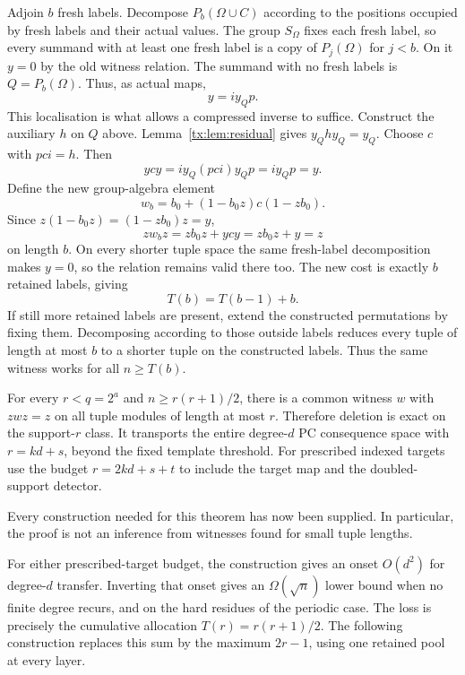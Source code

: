 Adjoin $b$ fresh labels. Decompose $P_b(\Omega\cup C)$ according to the positions occupied by fresh labels and their actual values. The group $S_\Omega$ fixes each fresh label, so every summand with at least one fresh label is a copy of $P_j(\Omega)$ for $j<b$. On it $y=0$ by the old witness relation. The summand with no fresh labels is $Q=P_b(\Omega)$. Thus, as actual maps,
\[y=i y_Q p.\]
This localisation is what allows a compressed inverse to suffice. Construct the auxiliary $h$ on $Q$ above. Lemma~\ref{tx:lem:residual} gives $y_Qhy_Q=y_Q$. Choose $c$ with $pci=h$. Then
\[ycy=i y_Q(pci)y_Qp=i y_Qp=y.\]
Define the new group-algebra element
\[w_b=b_0+(1-b_0z)c(1-zb_0).\]
Since $z(1-b_0z)=(1-zb_0)z=y$,
\[zw_bz=zb_0z+ycy=zb_0z+y=z\]
on length $b$. On every shorter tuple space the same fresh-label decomposition makes $y=0$, so the relation remains valid there too. The new cost is exactly $b$ retained labels, giving
\[T(b)=T(b-1)+b.\]
If still more retained labels are present, extend the constructed permutations by fixing them. Decomposing according to those outside labels reduces every tuple of length at most $b$ to a shorter tuple on the constructed labels. Thus the same witness works for all $n\ge T(b)$.

\begin{theorem}
For every $r<q=2^a$ and $n\ge r(r+1)/2$, there is a common witness $w$ with $zwz=z$ on all tuple modules of length at most $r$. Therefore deletion is exact on the support-$r$ class. It transports the
entire degree-$d$ PC consequence space with $r=kd+s$, beyond the fixed
template threshold. For prescribed indexed targets use the budget
$r=2kd+s+t$ to include the target map and the doubled-support detector.
\end{theorem}
Every construction needed for this theorem has now been supplied. In particular, the proof is not an inference from witnesses found for small tuple lengths.


\begin{remark}
For either prescribed-target budget, the construction gives an onset
$O(d^2)$ for degree-$d$ transfer.
Inverting that onset gives an $\Omega(\sqrt n)$ lower bound when no
finite degree recurs, and on the hard residues of the periodic case.
The loss is precisely the cumulative allocation $T(r)=r(r+1)/2$.
The following construction replaces this sum by the maximum $2r-1$,
using one retained pool at every layer.
\end{remark}

